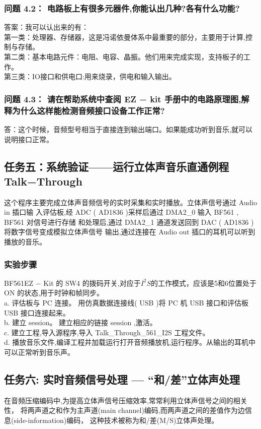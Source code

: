 \documentclass{article}
\begin{document}
\begin{CJK}{UTF8}{gbsn}
\subsubsection*{问题 4.2： 电路板上有很多元器件,你能认出几种?各有什么功能?}
答案：我可以认出来的有：\\
第一类：处理器、存储器，这是冯诺依曼体系中最重要的部分，主要用于计算,控制与存储。\\
第二类：基本电路元件：电阻、电容、晶振。他们用来完成实现，支持板子的工作。\\
第三类：IO接口和供电口:用来烧录，供电和输入输出。
\subsubsection*{问题 4.3： 请在帮助系统中查阅 EZ − kit 手册中的电路原理图,解释为什么这样能检测音频接口设备工作正常?}
答：这个时候，音频型号相当于直接连到输出端口。如果能成功听到音乐,就可以说明接口正常。
\subsection{任务五：系统验证——运行立体声音乐直通例程Talk−Through}
这个程序主要完成立体声音频信号的实时采集和实时播放。立体声信号通过 Audio in 插口输
入评估板,经 ADC ( AD1836 )采样后通过 DMA2\_0 输入 BF561 , BF561 对信号进行存储
和处理后,通过 DMA2\_1 通道发送回到 DAC ( AD1836 )将数字信号变成模拟立体声信号
输出,通过连接在 Audio out 插口的耳机可以听到播放的音乐。
\subsubsection{实验步骤}
BF561EZ − Kit 的 SW4 的拨码开关,对应于\(I^2S\)的工作模式，应该是5和6位置处于 ON 的状态,用于时钟和帧同步。\\
a. 评估板与 PC 连接。
用仿真数据连接线( USB )将 PC 机 USB 接口和评估板 USB 接口连接起来。\\
b. 建立 session。
建立相应的链接 session ,激活。\\
c. 建立工程,导入源程序,导入 Talk\_Through\_561\_I2S 工程文件。\\
d. 播放音乐文件,编译工程并加载运行打开音频播放机,运行程序。从输出的耳机中可以正常听到音乐声。
\subsection{任务六: 实时音频信号处理 — “和/差”立体声处理}
在音频压缩编码中,为提高立体声信号压缩效率,常常利用立体声信号之间的相关性，
将两声道之和作为主声道(main channel)编码,而两声道之间的差值作为边信息(side-information)编码，
这种技术被称为和/差(M/S)立体声处理。

\end{CJK}
\end{document}
